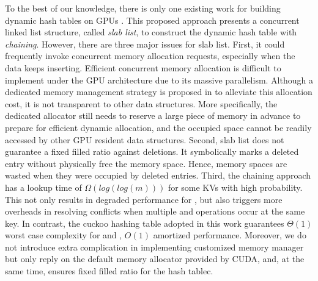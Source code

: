 To the best of our knowledge, there is only one existing work for building dynamic hash tables on GPUs \cite{ashkiani2018dynamic}.
This proposed approach presents a concurrent linked list structure, called \emph{slab list}, to construct the dynamic hash table with \emph{chaining}. 
However, there are three major issues for slab list. 
First, it could frequently invoke concurrent memory allocation requests, especially when the data keeps inserting. Efficient concurrent memory allocation is difficult to implement under the GPU architecture due to its massive parallelism. Although a dedicated memory management strategy is proposed in \cite{ashkiani2018dynamic} to alleviate this allocation cost, it is not transparent to other data structures. More specifically, the dedicated allocator still needs to reserve a large piece of memory in advance to prepare for efficient dynamic allocation, and the occupied space cannot be readily accessed by other GPU resident data structures. 
Second, slab list does not guarantee a fixed filled ratio against deletions. 
It symbolically marks a deleted entry without physically free the memory space. 
Hence, memory spaces are wasted when they were occupied by deleted entries. 
Third, the chaining approach has a lookup time of $\Omega(log(log(m)))$ for some KVs with high probability. This not only results in degraded performance for , but also triggers more overheads in resolving conflicts when multiple  and  operations occur at the same key.
In contrast, the cuckoo hashing table adopted in this work guarantees $\Theta(1)$ worst case complexity for  and , 
$O(1)$ amortized  performance. Moreover, we do not introduce extra complication in implementing customized memory manager but only reply on the default memory allocator provided by CUDA, and, at the same time, ensures fixed filled ratio for the hash tablec.